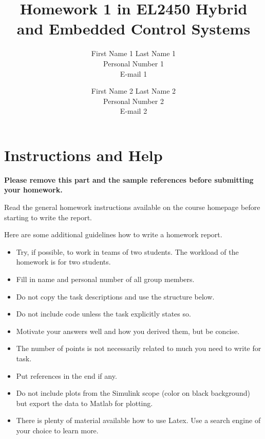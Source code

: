 \documentclass[a4paper,12pt,oneside,onecolumn]{article} %
\begin{document}

\title{Homework 1 in EL2450 Hybrid and Embedded Control Systems}
\author{
  First Name 1 Last Name 1 \\ Personal Number 1 \\ E-mail 1 
  \and 
  First Name 2 Last Name 2 \\ Personal Number 2 \\ E-mail 2
  }

\maketitle                     %





\section*{Instructions and Help}

\textbf{Please remove this part and the sample references before submitting your homework.}

Read the general homework instructions available on the course homepage before starting to write the report.

Here are some additional guidelines how to write a homework report.
\begin{itemize}
 \item Try, if possible, to work in teams of two students. The workload of the homework is for two students.
 \item Fill in name and personal number of all group members.
 \item Do not copy the task descriptions and use the structure below.
 \item Do not include code unless the task explicitly states so.
 \item Motivate your answers well and how you derived them, but be concise.
 \item The number of points is not necessarily related to much you need to write for task.
 \item Put references in the end if any.
 \item Do not include plots from the Simulink scope (color on black background) but export the data to Matlab for plotting.
 \item There is plenty of material available how to use Latex. Use a search engine of your choice to learn more.
\end{itemize}
\end{document}
